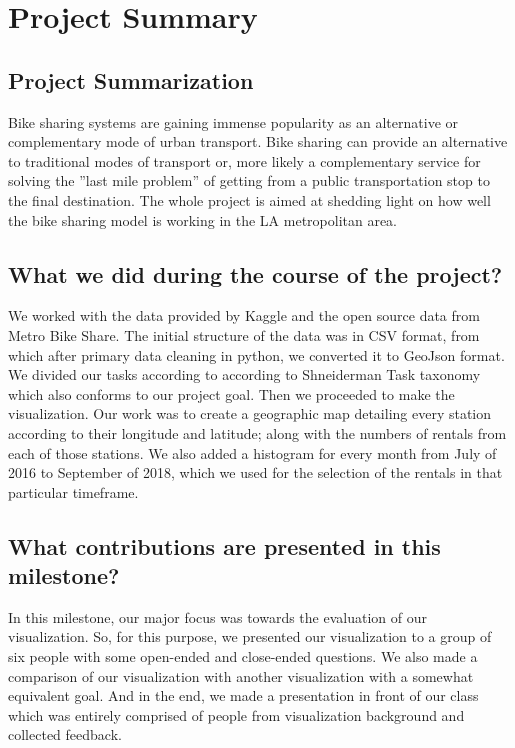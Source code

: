 \section{Project Summary} 
\label{sec:project_summary}

 

\subsection{Project Summarization}
 
Bike sharing systems are gaining immense popularity as an alternative or complementary mode of urban transport. Bike sharing can provide an alternative to traditional modes of transport or, more likely a complementary service for solving the ”last mile problem” of getting from a public transportation stop to the final destination. The whole project is aimed at shedding light on how well the bike sharing model is working in the LA metropolitan area.  

\subsection{What we did during the course of the project?}

We worked with the data provided by Kaggle and the open source data from Metro Bike Share. The initial structure of the data was in CSV format, from which after primary data cleaning in python, we converted it to GeoJson format. We divided our tasks according to according to Shneiderman Task taxonomy which also conforms to our project goal. Then we proceeded to make the visualization. Our work was to create a geographic map detailing every station according to their longitude and latitude; along with the numbers of rentals from each of those stations. We also added a histogram for every month from July of 2016 to September of 2018, which we used for the selection of the rentals in that particular timeframe. 


\subsection{What contributions are presented in this milestone?}
 
In this milestone, our major focus was towards the evaluation of our visualization. So, for this purpose, we presented our visualization to a group of six people with some open-ended and close-ended questions. We also made a comparison of our visualization with another visualization with a somewhat equivalent goal. And in the end, we made a presentation in front of our class which was entirely comprised of people from visualization background and collected feedback.

